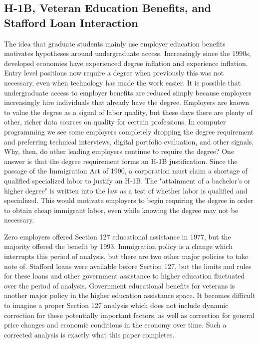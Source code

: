 \documentclass[review]{elsarticle}
\begin{document}
    \subsection{H-1B, Veteran Education Benefits, and Stafford Loan Interaction}
    The idea that graduate students mainly use employer education benefits motivates hypotheses around undergraduate access.
    Increasingly since the 1990s, developed economies have experienced degree inflation and experience inflation.
    Entry level positions now require a degree when previously this was not necessary, even when technology has made the work easier.
    It is possible that undergraduate access to employer benefits are reduced simply because employers increasingly hire individuals that already have the degree.
    Employers are known to value the degree as a signal of labor quality, but these days there are plenty of other, richer data sources on quality for certain professions.
    In computer programming we see some employers completely dropping the degree requirement and preferring technical interviews, digital portfolio evaluation, and other signals.
    Why, then, do other leading employers continue to require the degree?
    One answer is that the degree requirement forms an H-1B justification.
    Since the passage of the Immigration Act of 1990\cite{law1990law}, a corporation must claim a shortage of qualified specialized labor to justify an H-1B.
    The "attainment of a bachelor's or higher degree" is written into the law as a test of whether labor is qualified and specialized.
    This would motivate employers to begin requiring the degree in order to obtain cheap immigrant labor, even while knowing the degree may not be necessary.

    Zero employers offered Section 127 educational assistance in 1977, but the majority offered the benefit by 1993.
    Immigration policy is a change which interrupts this period of analysis, but there are two other major policies to take note of.
    Stafford loans were available before Section 127, but the limits and rules for these loans and other government assistance to higher education fluctuated over the period of analysis.
    Government educational benefits for veterans is another major policy in the higher education assistance space.
    It becomes difficult to imagine a proper Section 127 analysis which does not include dynamic correction for these potentially important factors,
    as well as correction for general price changes and economic conditions in the economy over time.
    Such a corrected analysis is exactly what this paper completes.
\end{document}

